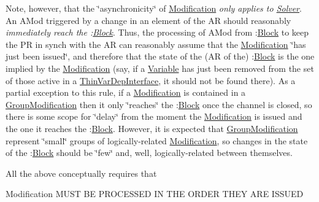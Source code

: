 \begin{DoxyEnumerate}
\item Note, however, that the \char`\"{}asynchronicity\char`\"{} of \mbox{\hyperlink{class_s_m_spp__di__unipi__it_1_1_modification}{Modification}} {\itshape only applies to \mbox{\hyperlink{class_s_m_spp__di__unipi__it_1_1_solver}{Solver}}}. An A\+Mod triggered by a change in an element of the AR should reasonably {\itshape immediately reach the \+:\mbox{\hyperlink{class_s_m_spp__di__unipi__it_1_1_block}{Block}}}. Thus, the processing of A\+Mod from \+:\mbox{\hyperlink{class_s_m_spp__di__unipi__it_1_1_block}{Block}} to keep the PR in synch with the AR can reasonably assume that the \mbox{\hyperlink{class_s_m_spp__di__unipi__it_1_1_modification}{Modification}} \char`\"{}has just been issued\char`\"{}, and therefore that the state of the (AR of the) \+:\mbox{\hyperlink{class_s_m_spp__di__unipi__it_1_1_block}{Block}} is the one implied by the \mbox{\hyperlink{class_s_m_spp__di__unipi__it_1_1_modification}{Modification}} (say, if a \mbox{\hyperlink{class_s_m_spp__di__unipi__it_1_1_variable}{Variable}} has just been removed from the set of those active in a \mbox{\hyperlink{class_s_m_spp__di__unipi__it_1_1_thin_var_dep_interface}{Thin\+Var\+Dep\+Interface}}, it should not be found there). As a partial exception to this rule, if a \mbox{\hyperlink{class_s_m_spp__di__unipi__it_1_1_modification}{Modification}} is contained in a \mbox{\hyperlink{class_s_m_spp__di__unipi__it_1_1_group_modification}{Group\+Modification}} then it only \char`\"{}reaches\char`\"{} the \+:\mbox{\hyperlink{class_s_m_spp__di__unipi__it_1_1_block}{Block}} once the channel is closed, so there is some scope for \char`\"{}delay\char`\"{} from the moment the \mbox{\hyperlink{class_s_m_spp__di__unipi__it_1_1_modification}{Modification}} is issued and the one it reaches the \+:\mbox{\hyperlink{class_s_m_spp__di__unipi__it_1_1_block}{Block}}. However, it is expected that \mbox{\hyperlink{class_s_m_spp__di__unipi__it_1_1_group_modification}{Group\+Modification}} represent \char`\"{}small\char`\"{} groups of logically-\/related \mbox{\hyperlink{class_s_m_spp__di__unipi__it_1_1_modification}{Modification}}, so changes in the state of the \+:\mbox{\hyperlink{class_s_m_spp__di__unipi__it_1_1_block}{Block}} should be \char`\"{}few\char`\"{} and, well, logically-\/related between themselves.
\item All the above conceptually requires that \begin{DoxyVerb}Modification MUST BE PROCESSED IN THE ORDER THEY ARE ISSUED
\end{DoxyVerb}



\end{DoxyEnumerate}
